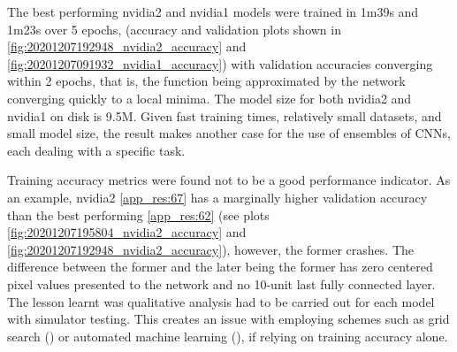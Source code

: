 The best performing nvidia2 and nvidia1 models were trained in 1m39s and 1m23s over 5 epochs, (accuracy and validation plots shown in \ref{fig:20201207192948_nvidia2_accuracy} and \ref{fig:20201207091932_nvidia1_accuracy}) with validation accuracies converging within 2 epochs, that is, the function being approximated by the network converging quickly to a local minima. 
The model size for both nvidia2 and nvidia1 on disk is 9.5M. Given fast training times, relatively small datasets, and small model size, the result makes another case for the use of ensembles of CNNs, each dealing with a specific task.






Training accuracy metrics were found not to be a good performance indicator.
As an example, nvidia2 \ref{app_res:67} has a marginally higher validation accuracy than the best performing \ref{app_res:62} (see plots \ref{fig:20201207195804_nvidia2_accuracy} and \ref{fig:20201207192948_nvidia2_accuracy}), however, the former crashes. The difference between the former and the later being the former has zero centered pixel values presented to the network and no 10-unit last fully connected layer. The lesson learnt was qualitative analysis had to be carried out for each model with simulator testing. This creates an issue with employing schemes such as grid search (\cite{bergstra2012random}) or automated machine learning (\cite{feurer2015efficient}), if relying on training accuracy alone.

